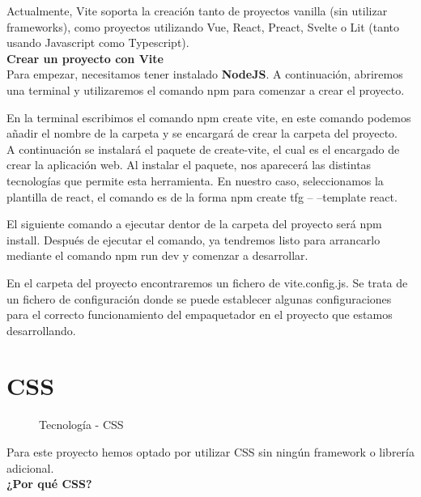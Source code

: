 Actualmente, Vite soporta la creación tanto de proyectos vanilla (sin utilizar frameworks), como proyectos utilizando Vue, React, Preact, Svelte o Lit (tanto usando Javascript como Typescript).\\

\textbf{Crear un proyecto con Vite} \\

Para empezar, necesitamos tener instalado \textbf{NodeJS}. A continuación, abriremos una terminal y utilizaremos el comando npm para comenzar a crear el proyecto.

En la terminal escribimos el comando npm create vite, en este comando podemos añadir el nombre de la carpeta y se encargará de crear la carpeta del proyecto. \\

A continuación se instalará el paquete de create-vite, el cual es el encargado de crear la aplicación web. Al instalar el paquete, nos aparecerá las distintas tecnologías que permite esta herramienta. En nuestro caso, seleccionamos la plantilla de react, el comando es de la forma npm create tfg -- --template react. 

El siguiente comando a ejecutar dentor de la carpeta del proyecto será npm install. Después de ejecutar el comando, ya tendremos listo para arrancarlo mediante el comando npm run dev y comenzar a desarrollar. 

En el carpeta del proyecto encontraremos un fichero de vite.config.js. Se trata de un fichero de configuración donde se puede establecer algunas configuraciones para el correcto funcionamiento del empaquetador en el proyecto que estamos desarrollando.

\newpage

\section{CSS}

\begin{figure}[h]
  \centering
   \caption{Tecnología - CSS}
  \end{figure}

Para este proyecto hemos optado por utilizar CSS sin ningún framework o librería adicional.\\

\textbf{¿Por qué CSS?}\\

